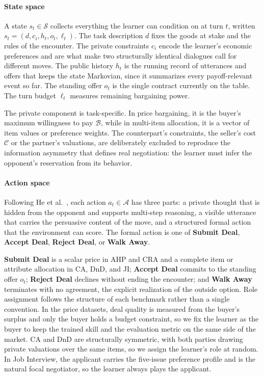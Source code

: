 \documentclass{interact}
\theoremstyle{plain}
\theoremstyle{definition}
\theoremstyle{remark}
\begin{document}
\paragraph{State space}
A state $s_t \in \mathcal{S}$ collects everything the learner can condition on at turn $t$, written $s_t=(d, c_i, h_t, o_t, \ell_t)$. The task description $d$ fixes the goods at stake and the rules of the encounter. The private constraints $c_i$ encode the learner's economic preferences and are what make two structurally identical dialogues call for different moves. The public history $h_t$ is the running record of utterances and offers that keeps the state Markovian, since it summarizes every payoff-relevant event so far. The standing offer $o_t$ is the single contract currently on the table. The turn budget $\ell_t$ measures remaining bargaining power. 

The private component is task-specific. In price bargaining, it is the buyer's maximum willingness to pay $\mathcal{B}$, while in multi-item allocation, it is a vector of item values or preference weights. The counterpart's constraints, the seller's cost $\mathcal{C}$ or the partner's valuations, are deliberately excluded to reproduce the information asymmetry that defines real negotiation: the learner must infer the opponent's reservation from its behavior.

\paragraph{Action space}
Following He et al.~\cite{he2018decoupling}, each action $a_t \in \mathcal{A}$ has three parts: a private thought that is hidden from the opponent and supports multi-step reasoning, a visible utterance that carries the persuasive content of the move, and a structured formal action that the environment can score. The formal action is one of \textbf{Submit Deal}, \textbf{Accept Deal}, \textbf{Reject Deal}, or \textbf{Walk Away}. 

\textbf{Submit Deal} is a scalar price in AHP and CRA and a complete item or attribute allocation in CA, DnD, and JI; \textbf{Accept Deal} commits to the standing offer $o_t$; \textbf{Reject Deal} declines without ending the encounter; and \textbf{Walk Away} terminates with no agreement, the explicit realization of the outside option. Role assignment follows the structure of each benchmark rather than a single convention. In the price datasets, deal quality is measured from the buyer's surplus and only the buyer holds a budget constraint, so we fix the learner as the buyer to keep the trained skill and the evaluation metric on the same side of the market. CA and DnD are structurally symmetric, with both parties drawing private valuations over the same items, so we assign the learner's role at random. In Job Interview, the applicant carries the five-issue preference profile and is the natural focal negotiator, so the learner always plays the applicant.
\end{document}
